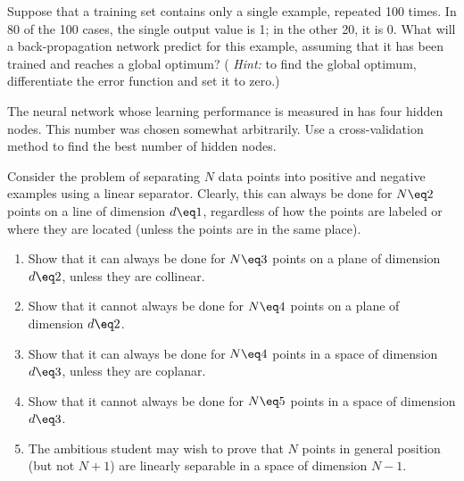 \begin{uexercise}
Suppose that a training set contains only a single example, repeated 100
times. In 80 of the 100 cases, the single output value is 1; in the other 20,
it is 0. What will a back-propagation network predict for this
example, assuming that it has been trained and reaches a global optimum? ({\em
Hint:} to find the global optimum, differentiate the error function and set it to
zero.)
\end{uexercise} 

\begin{exercise}
The neural network whose learning performance is measured in  has four hidden
nodes. This number was chosen somewhat arbitrarily. Use a
cross-validation method to find the best
number of hidden nodes.
\end{exercise} 

\begin{exercise}
Consider the problem of separating \(N\) data points into positive and negative
examples using a linear separator. Clearly, this can always be done
for \(N\eq2\) points on a line of dimension \(d\eq1\),
regardless of how the points are labeled or where they are located
(unless the points are in the same place).
\begin{enumerate}
\item Show that it can always be done for \(N\eq3\) points
on a plane of dimension \(d\eq2\), unless they are collinear.
\item Show that it cannot always be done for \(N\eq4\) points
on a plane of dimension \(d\eq2\).
\item Show that it can always be done for \(N\eq4\) points
in a space of dimension \(d\eq3\), unless they are coplanar.
\item Show that it cannot always be done for \(N\eq5\) points
in a space of dimension \(d\eq3\).
\item The ambitious student may wish to prove that
\(N\) points in general position (but not \(N+1\)) are linearly separable in a 
space of dimension \(N-1\). 
\end{enumerate}


\end{exercise} 

